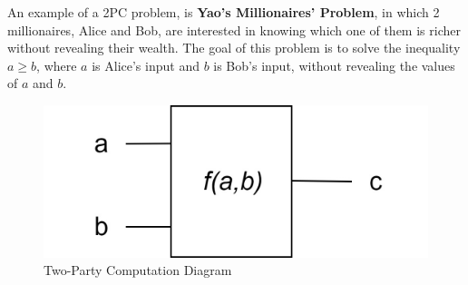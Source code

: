 An example of a 2PC problem, is \textbf{Yao's Millionaires' Problem}, in which 2 millionaires, Alice and Bob, are
interested in knowing which one of them is richer without revealing their wealth. The goal of this problem is to solve
the inequality $a\geq b$, where $a$ is Alice's input and $b$ is Bob's input, without revealing the values
of $a$ and $b$.

\renewcommand{\figurename}{Figure}
\begin{figure}[H]
\centering
\includegraphics[width=.4\linewidth]{./figures/mpc/two_party_computation_scheme}
\caption{Two-Party Computation Diagram}
\label{fig:tpcscheme}
\end{figure}

